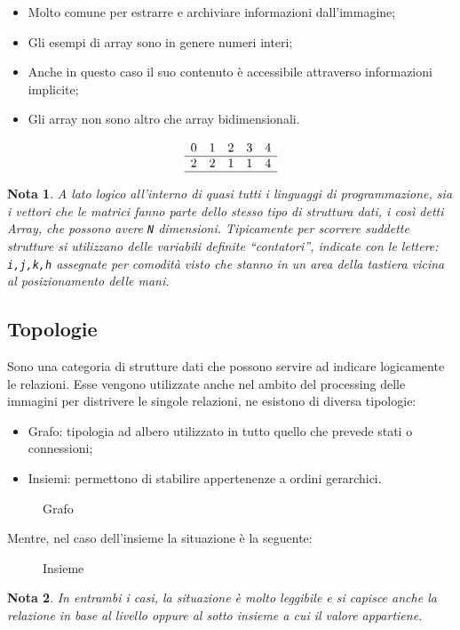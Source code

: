 \documentclass{report}
\newtheorem{nota}{Nota}[section]
\begin{document}
\begin{itemize}
\item Molto comune per estrarre e archiviare informazioni dall'immagine;
\item Gli esempi di array sono in genere numeri interi;
\item Anche in questo caso il suo contenuto è accessibile attraverso
  informazioni implicite;
\item Gli array non sono altro che array bidimensionali.
\end{itemize}
\begin{equation}
  \label{eq:vettore}
  \begin{array}{ccccc}
    0&1&2&3&4\\\hline
    2&2&1&1&4\\\hline
  \end{array}
\end{equation}
\begin{nota}
  A lato logico all'interno di quasi tutti i linguaggi di
  programmazione, sia i vettori che le matrici fanno parte dello stesso
  tipo di struttura dati, i così detti Array, che possono avere
  \texttt{N} dimensioni. Tipicamente per scorrere suddette strutture si
  utilizzano delle variabili definite ``contatori'', indicate con le
  lettere: \texttt{i,j,k,h} assegnate per comodità visto che stanno in
  un area della tastiera vicina al posizionamento delle mani.
\end{nota}

\subsection{Topologie}
\label{sec:topologie}
Sono una categoria di strutture dati che possono servire ad indicare
logicamente le relazioni. Esse vengono utilizzate anche nel ambito
del processing delle immagini per distrivere le singole relazioni,
ne esistono di diversa tipologie:
\begin{itemize}
\item Grafo: tipologia ad albero utilizzato in tutto quello che prevede
  stati o connessioni;
\item Insiemi: permettono di stabilire appertenenze a ordini gerarchici.
\end{itemize}
\begin{figure}[ht!]
  \centering
  
  \caption{Grafo}
  \label{fig:grafo}
\end{figure}
Mentre, nel caso dell'insieme la situazione è la seguente:
\begin{figure}[ht!]
  \centering
  \resizebox{8cm}{!}{
  }
  \caption{Insieme}
  \label{fig:insieme}
\end{figure}
\begin{nota}
  In entrambi i casi, la situazione è molto leggibile e si capisce
  anche la relazione in base al livello oppure al sotto insieme a cui
  il valore appartiene.
\end{nota}
\end{document}
